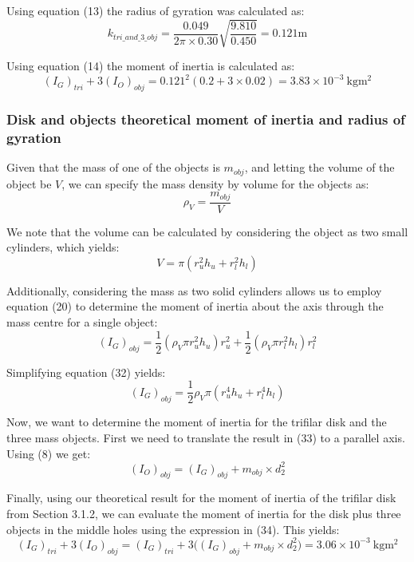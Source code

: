 \documentclass[a4paper]{article}
\begin{document}
Using equation (13) the radius of gyration was calculated as:
\begin{equation}
k_{tri\_and\_3\_obj} = \frac{0.049}{2 \pi \times 0.30}\sqrt{\frac{9.810}{0.450}} = 0.121\si{\meter}
\end{equation}

Using equation (14) the moment of inertia is calculated as:
\begin{equation}
(I_G)_{tri} + 3(I_O)_{obj} = 0.121^2 (0.2 + 3 \times 0.02) = 3.83 \times 10^{-3} \ \si{\kilogram\meter^2}
\end{equation}

\subsubsection{Disk and objects theoretical moment of inertia and radius of gyration}
Given that the mass of one of the objects is $m_{obj}$, and letting the volume of the object be $V$, we can specify the mass density by volume for the objects as:
\begin{equation}
	\rho_V = \frac{m_{obj}}{V}
\end{equation}

We note that the volume can be calculated by considering the object as two small cylinders, which yields:
\begin{equation}
	V = \pi (r_u^2 h_u + r_l^2 h_l)
\end{equation}

Additionally, considering the mass as two solid cylinders allows us to employ equation (20) to determine the moment of inertia about the axis through the mass centre for a single object:
\begin{equation}
	(I_G)_{obj} = \frac{1}{2} (\rho_V \pi r_u^2 h_u) r_u^2 + \frac{1}{2} (\rho_V \pi r_l^2 h_l) r_l^2 
\end{equation}

Simplifying equation (32) yields:
\begin{equation}
	(I_G)_{obj} = \frac{1}{2} \rho_V \pi (r_u^4 h_u + r_l^4 h_l)
\end{equation}

Now, we want to determine the moment of inertia for the trifilar disk and the three mass objects. First we need to translate the result in (33) to a parallel axis. Using (8) we get:
\begin{equation}
	(I_O)_{obj} = (I_G)_{obj} + m_{obj} \times d_2^2
\end{equation}

Finally, using our theoretical result for the moment of inertia of the trifilar disk from Section 3.1.2, we can evaluate the moment of inertia for the disk plus three objects in the middle holes using the expression in (34). This yields:
\begin{equation}
	(I_G)_{tri} + 3(I_O)_{obj} = (I_G)_{tri} + 3 \big( (I_G)_{obj} + m_{obj} \times d_2^2 \big) = 3.06 \times 10^{-3} \ \si{\kilogram\meter^2}
\end{equation}
\end{document}
